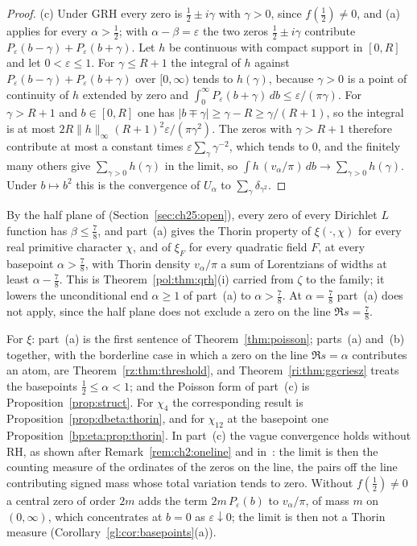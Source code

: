 \begin{proof}
(c) Under GRH every zero is $\tfrac12\pm i\gamma$ with $\gamma>0$, since $f(\tfrac12)\ne0$, and (a) applies for every $\alpha>\tfrac12$; with $\alpha-\beta=\varepsilon$ the two zeros $\tfrac12\pm i\gamma$ contribute $P_\varepsilon(b-\gamma)+P_\varepsilon(b+\gamma)$. Let $h$ be continuous with compact support in $[0,R]$ and let $0<\varepsilon\le1$. For $\gamma\le R+1$ the integral of $h$ against $P_\varepsilon(b-\gamma)+P_\varepsilon(b+\gamma)$ over $[0,\infty)$ tends to $h(\gamma)$, because $\gamma>0$ is a point of continuity of $h$ extended by zero and $\int_0^\infty P_\varepsilon(b+\gamma)\,db\le\varepsilon/(\pi\gamma)$. For $\gamma>R+1$ and $b\in[0,R]$ one has $|b\mp\gamma|\ge\gamma-R\ge\gamma/(R+1)$, so the integral is at most $2R\|h\|_\infty(R+1)^2\varepsilon/(\pi\gamma^2)$. The zeros with $\gamma>R+1$ therefore contribute at most a constant times $\varepsilon\sum_\gamma\gamma^{-2}$, which tends to $0$, and the finitely many others give $\sum_{\gamma>0}h(\gamma)$ in the limit, so $\int h\,(v_\alpha/\pi)\,db\to\sum_{\gamma>0}h(\gamma)$. Under $b\mapsto b^2$ this is the convergence of $U_\alpha$ to $\sum_\gamma\delta_{\gamma^2}$.
\end{proof}

By the half plane of \cite{OAI26a} (Section~\ref{sec:ch25:open}), every zero of every Dirichlet $L$ function has $\beta\le\tfrac78$, and part~(a) gives the Thorin property of $\xi(\cdot,\chi)$ for every real primitive character $\chi$, and of $\xi_F$ for every quadratic field $F$, at every basepoint $\alpha>\tfrac78$, with Thorin density $v_\alpha/\pi$ a sum of Lorentzians of widths at least $\alpha-\tfrac78$. This is Theorem~\ref{pol:thm:qrh}(i) carried from $\zeta$ to the family; it lowers the unconditional end $\alpha\ge1$ of part~(a) to $\alpha>\tfrac78$. At $\alpha=\tfrac78$ part~(a) does not apply, since the half plane does not exclude a zero on the line $\Re s=\tfrac78$.

For $\xi$: part~(a) is the first sentence of Theorem~\ref{thm:poisson}; parts~(a) and~(b) together, with the borderline case in which a zero on the line $\Re s=\alpha$ contributes an atom, are Theorem~\ref{rz:thm:threshold}, and Theorem~\ref{ri:thm:ggcriesz} treats the basepoints $\tfrac12\le\alpha<1$; and the Poisson form of part~(c) is Proposition~\ref{prop:struct}. For $\chi_4$ the corresponding result is Proposition~\ref{prop:dbeta:thorin}, and for $\chi_{12}$ at the basepoint one Proposition~\ref{bp:eta:prop:thorin}. In part~(c) the vague convergence holds without RH, as shown after Remark~\ref{rem:ch2:oneline} and in~\cite[Proposition~9.5]{P17}: the limit is then the counting measure of the ordinates of the zeros on the line, the pairs off the line contributing signed mass whose total variation tends to zero. Without $f(\tfrac12)\ne0$ a central zero of order $2m$ adds the term $2m\,P_\varepsilon(b)$ to $v_\alpha/\pi$, of mass $m$ on $(0,\infty)$, which concentrates at $b=0$ as $\varepsilon\downarrow0$; the limit is then not a Thorin measure (Corollary~\ref{gl:cor:basepoints}(a)).

